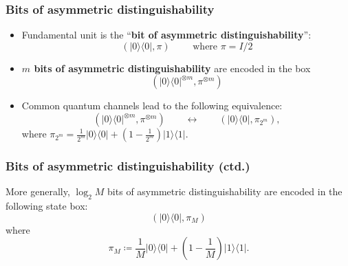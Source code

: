 \documentclass[usenames,dvipsnames,handout]{beamer}
\begin{document}
\begin{frame}
\frametitle{Bits of asymmetric distinguishability}

\begin{itemize}

\pause
\item Fundamental unit  is the ``{\color{MidnightBlue}\textbf{bit of asymmetric distinguishability}}'':
$$
(|0\rangle\!\langle 0 |, \pi) \qquad \text{ where } \pi = I/2
$$

\pause
\vspace{.1in}
\item {\color{MidnightBlue}\textbf{$m$ bits of asymmetric distinguishability}} are encoded in the box
$$
(|0\rangle\!\langle 0 |^{\otimes m}, \pi^{\otimes m})
$$

\pause
\vspace{.1in}
\item Common quantum channels lead to the following equivalence:
$$
(|0\rangle\!\langle 0 |^{\otimes m}, \pi^{\otimes m}) \qquad \leftrightarrow \qquad  (|0\rangle\!\langle 0 |, \pi_{2^m}),
$$
where $\pi_{2^m} = \frac{1}{2^m}|0\rangle\!\langle 0 | + \left(1-\frac{1}{2^m}\right)  |1\rangle\!\langle 1 |$.



\end{itemize}

\end{frame}

\begin{frame}
\frametitle{Bits of asymmetric distinguishability (ctd.)}

More generally, $\log_2 M $ bits of asymmetric distinguishability are encoded in the following state box:
$$
(|0\rangle\!\langle 0 |, \pi_M)
$$
where $$\pi_{M} \coloneqq  \frac{1}{M}|0\rangle\!\langle 0 | + \left(1-\frac{1}{M}\right)  |1\rangle\!\langle 1 |.$$

\end{frame}
\end{document}
